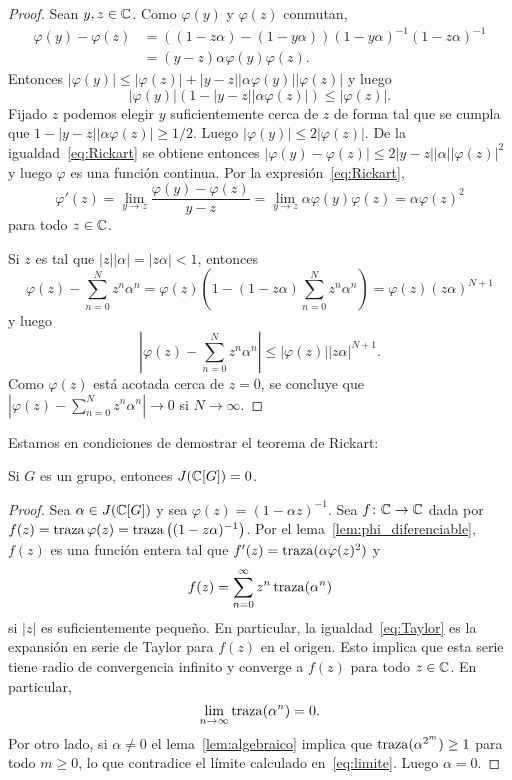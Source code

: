 \begin{proof}	
	Sean $y,z\in\mathbb{C}$. Como $\varphi(y)$ y $\varphi(z)$ conmutan, 
	\begin{equation}
		\label{eq:Rickart}
		\begin{aligned}
			\varphi(y)-\varphi(z)&=\left( (1-z\alpha)-(1-y\alpha)\right)(1-y\alpha)^{-1}(1-z\alpha)^{-1}\\
			&=(y-z)\alpha\varphi(y)\varphi(z).
		\end{aligned}
	\end{equation}
	Entonces $|\varphi(y)|\leq|\varphi(z)|+|y-z||\alpha\varphi(y)||\varphi(z)|$ y luego
	\[
		|\varphi(y)|\left( 1-|y-z||\alpha\varphi(z)|\right)\leq|\varphi(z)|.
	\]
	Fijado $z$ podemos elegir $y$ suficientemente cerca de $z$ de forma tal que
	se cumpla que  $1-|y-z||\alpha\varphi(z)|\geq1/2$. Luego
	$|\varphi(y)|\leq2|\varphi(z)|$. De la igualdad~\eqref{eq:Rickart} se
	obtiene entonces $|\varphi(y)-\varphi(z)|\leq2|y-z||\alpha||\varphi(z)|^2$
	y luego $\varphi$ es una función continua. Por la
	expresión~\eqref{eq:Rickart}, 
	\[
	\varphi'(z)
	=\lim_{y\to z}\frac{\varphi(y)-\varphi(z)}{y-z}
	=\lim_{y\to z}\alpha\varphi(y)\varphi(z)
	=\alpha\varphi(z)^2
	\]
	para todo $z\in\mathbb{C}$.

	Si $z$ es tal que $|z||\alpha|=|z\alpha|<1$, entonces 
	\[
		\varphi(z)-\sum_{n=0}^Nz^n\alpha^n
		=\varphi(z)\left(1-(1-z\alpha)\sum_{n=0}^Nz^n\alpha^n\right)
		=\varphi(z)(z\alpha)^{N+1}
	\]
	y luego
	\[
		\left|\varphi(z)-\sum_{n=0}^Nz^n\alpha^n\right|\leq|\varphi(z)||z\alpha|^{N+1}.
	\]
	Como $\varphi(z)$ está acotada cerca de $z=0$, se concluye que
	$\left|\varphi(z)-\sum_{n=0}^Nz^n\alpha^n\right|\to0$ si $N\to\infty$.
\end{proof}

Estamos en condiciones de demostrar el teorema de Rickart:

\begin{theorem}[Rickart]
	Si $G$ es un grupo, entonces $J(\mathbb{C}[G])=0$.
\end{theorem}

\begin{proof}
	Sea $\alpha\in J(\mathbb{C}[G])$ y sea $\varphi(z)=(1-\alpha z)^{-1}$. Sea 
	$f\colon\mathbb{C}\to \mathbb{C}$ dada por
	$f(z)=\operatorname{traza}\varphi(z)=\operatorname{traza}\left((1-z\alpha)^{-1}\right)$. Por el lema~\ref{lem:phi_diferenciable},
	$f(z)$ es una función entera tal que $f'(z)=\operatorname{traza}(\alpha\varphi(z)^2)$ y
	\begin{equation}
		\label{eq:Taylor}
		f(z)=\sum_{n=0}^\infty z^n\operatorname{traza}(\alpha^n)
	\end{equation}
	si $|z|$ es suficientemente pequeño. En particular, la
	igualdad~\eqref{eq:Taylor} es la expansión en serie de Taylor para $f(z)$
	en el origen. Esto implica que esta serie tiene radio de convergencia
	infinito y converge a $f(z)$ para todo $z\in\mathbb{C}$. En particular,
	\begin{equation}
		\label{eq:limite}
		\lim_{n\to\infty}\operatorname{traza}(\alpha^n)=0.
	\end{equation}
	Por otro lado, si $\alpha\ne0$ el lema~\ref{lem:algebraico} implica que
	$\operatorname{traza}(\alpha^{2^m})\geq1$ para todo $m\geq0$, lo que contradice el límite
	calculado en~\eqref{eq:limite}. Luego $\alpha=0$.
\end{proof}


